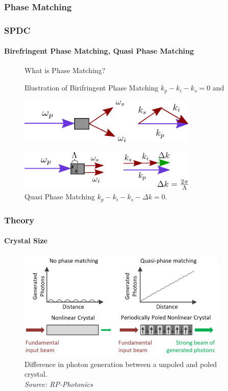 \documentclass[serif,8pt]{beamer}
\begin{document}
\subsubsection{Phase Matching}
\begin{frame}
	\frametitle{SPDC}
	\framesubtitle{Birefringent Phase Matching, Quasi Phase Matching}
\begin{figure}
	What is Phase Matching?
		\begin{center}
		\caption{Illustration of Birifringent Phase Matching $k_p - k_i - k_s = 0$ and}
		  \includegraphics[width=8.5cm]{SPDCkPM.png}\\
		\caption{Quasi Phase Matching $k_p - k_i -k_s - \Delta k = 0$.}
		  \includegraphics[width=8.5cm]{SPDCkQPM.png}
		\end{center}
		\label{fig:SPDCk}
	\end{figure}
\end{frame}

\begin{frame}[t]
	\frametitle{Theory}
	\framesubtitle{Crystal Size}
	\begin{figure}
		\caption{Difference in photon generation between a unpoled and poled crystal.\\\textit{Source: RP-Photonics}}
		\begin{center}
			\includegraphics[width=10cm]{PolledVsNot.png}
		\end{center}
		\label{fig:poledvsnot}
	\end{figure}
	
\end{frame}
\end{document}
